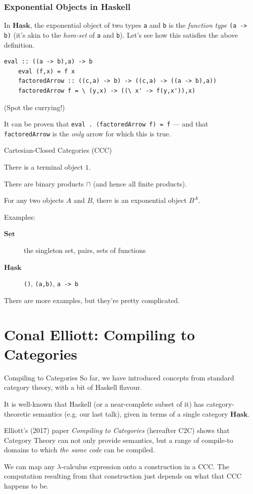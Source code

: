\documentclass[10pt]{beamer}
\newcommand{\Cat}[1]{\ensuremath{\underline{\mathbf{#1}}}}
\theoremstyle{definition}
\theoremstyle{remark}
\numberwithin{equation}{section}
\begin{document}
\begin{frame}
  \frametitle{Exponential Objects in Haskell}

  In $\Cat{Hask}$, the exponential object of two types \lstinline{a} and
  \lstinline{b} is the \emph{function type} \lstinline{(a -> b)} (it's akin to
  the \emph{hom-set} of \lstinline{a} and \lstinline{b}). Let's see
  how this satisfies the above definition.

  \begin{lstlisting}[frame=single]
    eval :: ((a -> b),a) -> b
    eval (f,x) = f x
    factoredArrow :: ((c,a) -> b) -> ((c,a) -> ((a -> b),a))
    factoredArrow f = \ (y,x) -> ((\ x' -> f(y,x')),x)
  \end{lstlisting}
  {\footnotesize{(Spot the currying!)}}

  It can be proven that \lstinline{eval . (factoredArrow f) = f} --- and that
  \lstinline{factoredArrow} is the \emph{only} arrow for which this is true.

\end{frame}

\begin{frame}[fragile]{Cartesian-Closed Categories (CCC)}

  There is a terminal object $1$.

  There are binary products $\sqcap$ (and hence all finite products).

  For any two objects $A$ and $B$, there is an exponential object $B^A$.

  Examples:
  \begin{description}
    \item[\Cat{Set}] the singleton set, pairs, sets of functions
    \item[\Cat{Hask}] \lstinline{()}, \lstinline{(a,b)}, \lstinline{a -> b}
  \end{description}

  There are more examples, but they're pretty complicated.

\end{frame}

\section{Conal Elliott: Compiling to Categories} %

\begin{frame}[fragile]{Compiling to Categories}
  So far, we have introduced concepts from standard category theory, with a bit of Haskell flavour.

  It is well-known that Haskell (or a near-complete subset of it) has category-theoretic semantics (e.g. our last talk), given in terms of a single category $\Cat{Hask}$.

  Elliott's (2017) paper \emph{Compiling to Categories} (hereafter C2C) shows that Category Theory can not only provide semantics, but a range of compile-to domains to which \emph{the same code} can be compiled.

  We can map any $\lambda$-calculus expression onto a construction in a CCC. The computation resulting from that construction just depends on what that CCC happens to be.
\end{frame}
\end{document}
